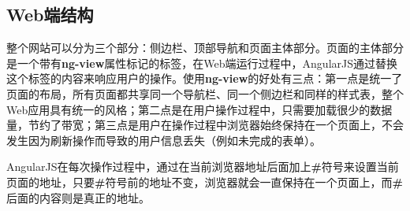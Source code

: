 \subsection{Web端结构}


整个网站可以分为三个部分：侧边栏、顶部导航和页面主体部分。页面的主体部分是一个带有\textbf{ng-view}属性标记的标签，在Web端运行过程中，AngularJS通过替换这个标签的内容来响应用户的操作。使用\textbf{ng-view}的好处有三点：第一点是统一了页面的布局，所有页面都共享同一个导航栏、同一个侧边栏和同样的样式表，整个Web应用具有统一的风格；第二点是在用户操作过程中，只需要加载很少的数据量，节约了带宽；第三点是用户在操作过程中浏览器始终保持在一个页面上，不会发生因为刷新操作而导致的用户信息丢失（例如未完成的表单）。

AngularJS在每次操作过程中，通过在当前浏览器地址后面加上\textbf{\#}符号来设置当前页面的地址，只要\textbf{\#}符号前的地址不变，浏览器就会一直保持在一个页面上，而\textbf{\#}后面的内容则是真正的地址。


%




